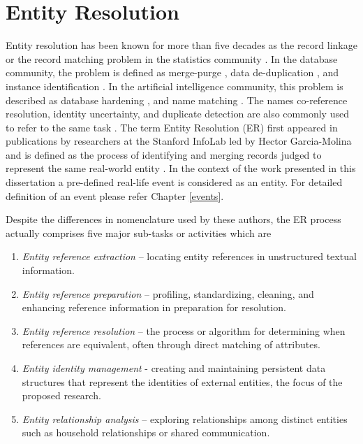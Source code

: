 \section{Entity Resolution\label{entityResolutionRelatedWork}}

Entity resolution has been known for more than five decades as the record linkage or the record matching problem in the statistics community \cite{fellegi1969theory,newcombe1959automatic,herzog2007data}. In the database community, the problem is defined as merge-purge \cite{hernandez1998real}, data de-duplication \cite{sarawagi2002interactive,ananthakrishna2002eliminating}, and instance identification \cite{wang1989inter}. In the artificial intelligence community, this problem is described as database hardening \cite{cohen2000hardening}, and name matching \cite{bilenko2003adaptive}. The names co-reference resolution, identity uncertainty, and duplicate detection are also commonly used to refer to the same task \cite{elmagarmid2007duplicate}. The term Entity Resolution (ER) first appeared in publications by researchers at the Stanford InfoLab led by Hector Garcia-Molina and is defined as the process of identifying and merging records judged to represent the same real-world entity \cite{garcia2006pair}. In the context of the work presented in this dissertation a pre-defined real-life event is considered as an entity. For detailed definition of an event please refer Chapter \ref{events}.

Despite the differences in nomenclature used by these authors, the ER process actually comprises five major sub-tasks or activities \cite{talburt2011entity} which are
\begin{enumerate} 
\item	\textit{Entity reference extraction} – locating entity references in unstructured textual information.
\item	\textit{Entity reference preparation} – profiling, standardizing, cleaning, and enhancing reference information in preparation for resolution.
\item	\textit{Entity reference resolution} – the process or algorithm for determining when references are equivalent, often through direct matching of attributes.
\item	\textit{Entity identity management} - creating and maintaining persistent data structures that represent the identities of external entities, the focus of the proposed research.
\item	\textit{Entity relationship analysis} – exploring relationships among distinct entities such as household relationships or shared communication.
\end{enumerate}

